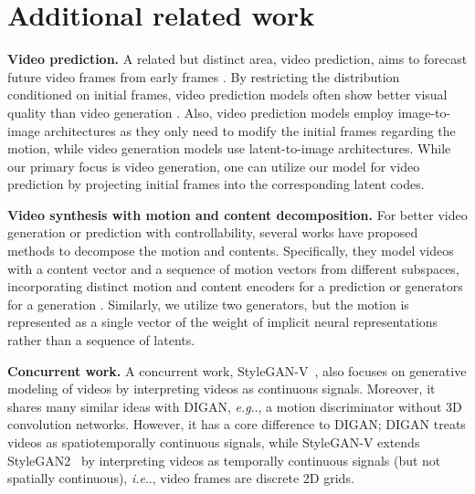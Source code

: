 \documentclass{article} \usepackage{iclr2022_conference,times}
\makeatletter
\DeclareRobustCommand\onedot{\futurelet\@let@token\@onedot}
\def\@onedot{\ifx\@let@token.\else.\null\fi\xspace}
\def\eg{\emph{e.g}\onedot} \def\Eg{\emph{E.g}\onedot}
\def\ie{\emph{i.e}\onedot} \def\Ie{\emph{I.e}\onedot}
\makeatother
\begin{document}
%
 
\clearpage
\section{Additional related work}
\label{appen:more_related}




\textbf{Video prediction.}
A related but distinct area, video prediction, aims to forecast future video frames from early frames \citep{srivastava2015unsupervised,finn2016unsupervised,denton2017unsupervised,babaeizadeh2018stochastic,denton2018stochastic,lee2018stochastic,villegas2019high,kumar2020videoflow,franceschi2020stochastic,luc2020transformation,lee2021revisiting}.
By restricting the distribution conditioned on initial frames, video prediction models often show better visual quality than video generation \citep{babaeizadeh2021fitvid}. Also, video prediction models employ image-to-image architectures as they only need to modify the initial frames regarding the motion, while video generation models use latent-to-image architectures. While our primary focus is video generation, one can utilize our model for video prediction by projecting initial frames into the corresponding latent codes.

\textbf{Video synthesis with motion and content decomposition.} For better video generation or prediction with controllability, several works have proposed methods to decompose the motion and contents.
Specifically, they model videos with a content vector and a sequence of motion vectors from different subspaces, incorporating distinct motion and content encoders for a prediction \citep{villegas2017decomposing, hsieh2018learning} or generators for a generation \citep{tulyakov2018mocogan, tian2021good, munoz2021temporal}. Similarly, we utilize two generators, but the motion is represented as a single vector of the weight of implicit neural representations rather than a sequence of latents.

\textbf{Concurrent work.}
A concurrent work, StyleGAN-V~\citep{skorokhodov2021stylegan}, also focuses on generative modeling of videos by interpreting videos as continuous signals. Moreover, it shares many similar ideas with DIGAN, \eg, a motion discriminator without 3D convolution networks. However, it has a core difference to DIGAN; DIGAN treats videos as spatiotemporally continuous signals, while StyleGAN-V extends StyleGAN2~\citep{karras2020analyzing} by interpreting videos as temporally continuous signals (but not spatially continuous), \ie, video frames are discrete 2D grids.
\end{document}
